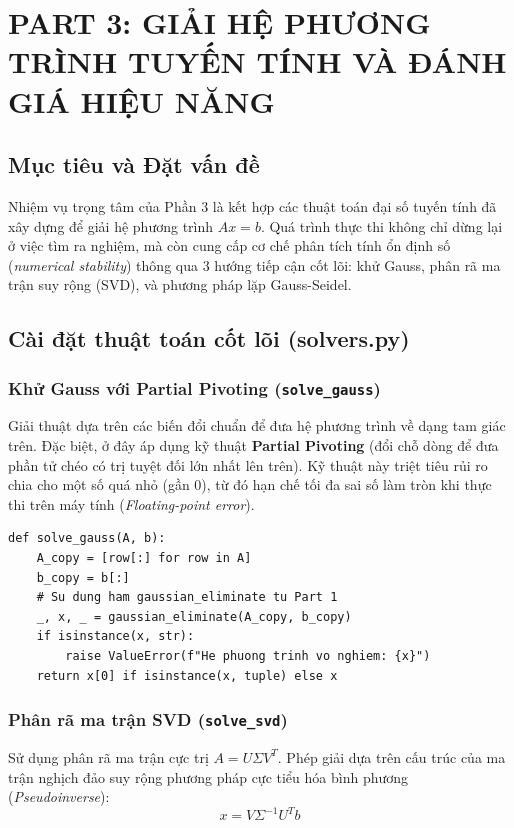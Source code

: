 \documentclass[a4paper,12pt]{article}
\begin{document}
\section{PART 3: GIẢI HỆ PHƯƠNG TRÌNH TUYẾN TÍNH VÀ ĐÁNH GIÁ HIỆU NĂNG}

\subsection{Mục tiêu và Đặt vấn đề}
Nhiệm vụ trọng tâm của Phần 3 là kết hợp các thuật toán đại số tuyến tính đã xây dựng để giải hệ phương trình $Ax = b$. Quá trình thực thi không chỉ dừng lại ở việc tìm ra nghiệm, mà còn cung cấp cơ chế phân tích tính ổn định số (\textit{numerical stability}) thông qua 3 hướng tiếp cận cốt lõi: khử Gauss, phân rã ma trận suy rộng (SVD), và phương pháp lặp Gauss-Seidel.

\subsection{Cài đặt thuật toán cốt lõi (solvers.py)}

\subsubsection{Khử Gauss với Partial Pivoting (\texttt{solve\_gauss})}
Giải thuật dựa trên các biến đổi chuẩn để đưa hệ phương trình về dạng tam giác trên. Đặc biệt, ở đây áp dụng kỹ thuật \textbf{Partial Pivoting} (đổi chỗ dòng để đưa phần tử chéo có trị tuyệt đối lớn nhất lên trên). Kỹ thuật này triệt tiêu rủi ro chia cho một số quá nhỏ (gần $0$), từ đó hạn chế tối đa sai số làm tròn khi thực thi trên máy tính (\textit{Floating-point error}).

\begin{lstlisting}[caption={Triển khai giải hệ phương trình bằng khử Gauss}]
def solve_gauss(A, b):
    A_copy = [row[:] for row in A]
    b_copy = b[:]
    # Su dung ham gaussian_eliminate tu Part 1
    _, x, _ = gaussian_eliminate(A_copy, b_copy)
    if isinstance(x, str):
        raise ValueError(f"He phuong trinh vo nghiem: {x}")
    return x[0] if isinstance(x, tuple) else x
\end{lstlisting}

\subsubsection{Phân rã ma trận SVD (\texttt{solve\_svd})}
Sử dụng phân rã ma trận cực trị $A = U \Sigma V^T$. Phép giải dựa trên cấu trúc của ma trận nghịch đảo suy rộng phương pháp cực tiểu hóa bình phương (\textit{Pseudoinverse}):
\begin{equation}
    x = V \Sigma^{-1} U^T b
\end{equation}
\end{document}
